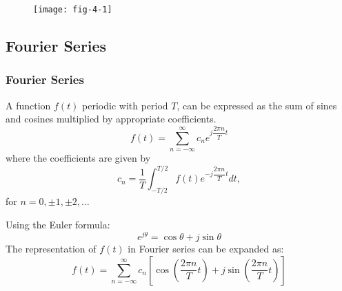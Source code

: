 
\begin{frame}
\begin{figure}
\centering
\texttt{[image: fig-4-1]}
\end{figure}
\end{frame}


\subsection{Fourier Series}


\begin{frame}
\frametitle{Fourier Series}
A function $f(t)$ periodic with period $T$, can be expressed as the sum of sines and cosines multiplied
by appropriate coefficients.
\begin{equation}
\boxed{
f(t) =
\sum_{n=-\infty}^{\infty}
c_{n}
e^{j\dfrac{2\pi n}{T}t}
}
\end{equation}
where the coefficients are given by
\begin{equation}
\boxed{
c_{n} = \dfrac{1}{T}
\int_{-T/2}^{T/2}
f(t)
e^{-j\dfrac{2\pi n}{T}t}
dt
}
,
\end{equation}
for $n=0,\pm 1, \pm 2, \ldots$
\end{frame}


\begin{frame}
Using the Euler formula:
\begin{equation}
e^{j\theta} = \cos\theta + j\sin\theta
\end{equation}
The representation of $f(t)$ in Fourier series can be expanded as:
\begin{equation}
f(t) =
\sum_{n=-\infty}^{\infty}
c_{n}
\left [
\cos \left ( \dfrac{2\pi n}{T}t \right ) +
j\sin \left ( \dfrac{2\pi n}{T}t \right )
\right ]
\end{equation}
\end{frame}


